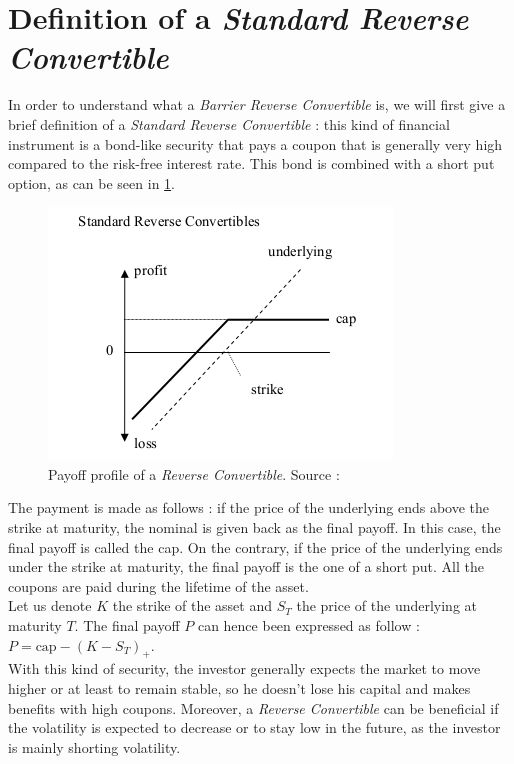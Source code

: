 \documentclass[a4paper,11pt,english]{book}
\begin{document}
\section{Definition of a \textit{Standard Reverse Convertible}}
In order to understand what a \textit{Barrier Reverse Convertible} is, we will first give a brief definition of a \textit{Standard Reverse Convertible} : this kind of financial instrument is a bond-like security that pays a coupon that is generally very high compared to the risk-free interest rate. This bond is combined with a short put option, as can be seen in \ref{fig:RC-payoff}.

\begin{figure}[!h]
    \centering
    \includegraphics[scale=0.7]{images/RC.png}
    \caption{Payoff profile of a \textit{Reverse Convertible}. Source : \cite{lindauer2008pricing}}
    \label{fig:RC-payoff}
\end{figure}

The payment is made as follows : if the price of the underlying ends above the strike at maturity, the nominal is given back as the final payoff. In this case, the final payoff is called the cap. On the contrary, if the price of the underlying ends under the strike at maturity, the final payoff is the one of a short put. All the coupons are paid during the lifetime of the asset.\\

Let us denote $K$ the strike of the asset and $S_{T}$ the price of the underlying at maturity $T$. The final payoff $P$ can hence been expressed as follow :
$P=\text{cap}-(K-S_{T})_{+}$.\\

With this kind of security, the investor generally expects the market to move higher or at least to remain stable, so he doesn't lose his capital and makes benefits with high coupons. Moreover, a \textit{Reverse Convertible} can be beneficial if the volatility is expected to decrease or to stay low in the future, as the investor is mainly shorting volatility.
\end{document}
